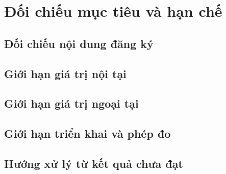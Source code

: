 \par{}
\section{Đối chiếu mục tiêu và hạn chế}\label{section:limitations-1}

\par{}
\subsection{Đối chiếu nội dung đăng ký}\label{subsection:limitations-2}

\par{}
\subsection{Giới hạn giá trị nội tại}\label{subsection:limitations-3}

\par{}
\subsection{Giới hạn giá trị ngoại tại}\label{subsection:limitations-4}

\par{}
\subsection{Giới hạn triển khai và phép đo}\label{subsection:limitations-5}

\par{}
\subsection{Hướng xử lý từ kết quả chưa đạt}\label{subsection:limitations-6}

